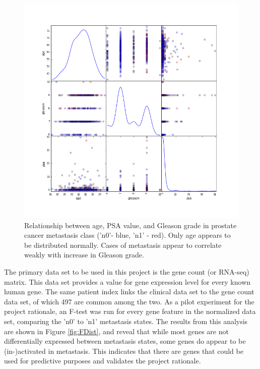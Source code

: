 \documentclass[final]{article}
\begin{document}
\begin{figure}[h!]
  \centering
  \includegraphics[scale=0.6]{ClinScatterMatrix}
  \caption{Relationship between age, PSA value, and Gleason grade in prostate cancer
  metastasis class ('n0'- blue, 'n1' - red).\label{fig:ClinSM}  Only age appears to
  be distributed normally.  Cases of metastasis appear to correlate weakly with
  increase in Gleason grade.}
\end{figure}

The primary data set to be used in this project is the gene count (or RNA-seq)
matrix.  This data set provides a value for gene expression level for every
known human gene. The same patient index links the clinical data set to the
gene count data set, of which 497 are common among the two.  As a pilot
experiment for the project rationale, an F-test was run for every gene feature
in the normalized data set, comparing the 'n0' to 'n1' metastasis states.  The
results from this analysis are  shown in Figure \ref{fig:FDist}, and reveal that
while most genes are not differentially expressed between metastasis states,
some genes do appear to be (in-)activated in metastasis. This indicates that there
are genes that could be used for predictive purposes and validates the project
rationale.
\end{document}
